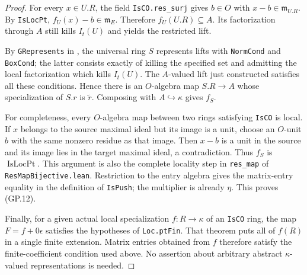 \begin{proof}
For every $x\in U.R$, the field \texttt{IsCO.res\_surj}
gives $b\in O$ with $x-b\in\mathfrak m_{U.R}$.
By \texttt{IsLocPt}, $f_U(x)-b\in\mathfrak m_E$.
Therefore $f_U(U.R)\subseteq A$.  Its factorization through
$A$ still kills $I_t(U)$ and yields the restricted lift.

By \texttt{GRepresents} in
, the universal ring
$S$ represents lifts with \texttt{NormCond} and
\texttt{BoxCond}; the latter consists exactly of killing the
specified set and admitting the local factorization which
kills $I_t(U)$.  The $A$-valued lift just constructed satisfies
all these conditions.  Hence there is an $O$-algebra map
$S.R\to A$ whose specialization of $S.r$ is $\widetilde r$.
Composing with $A\hookrightarrow\kappa$ gives $f_S$.

For completeness, every $O$-algebra map between two rings
satisfying \texttt{IsCO} is local.  If $x$ belongs to the
source maximal ideal but its image is a unit, choose an
$O$-unit $b$ with the same nonzero residue as that image.
Then $x-b$ is a unit in the source and its image lies in the
target maximal ideal, a contradiction.  Thus $f_S$ is
$\operatorname{IsLocPt}$.  This argument is also the complete
locality step in \texttt{res\_map} of
\texttt{ResMapBijective.lean}.  Restriction to the entry
algebra gives the matrix-entry equality in the definition of
\texttt{IsPush}; the multiplier is already $\eta$.
This proves (GP.12).

Finally, for a given actual local specialization $f:R\to\kappa$
of an \texttt{IsCO} ring, the map $F=f+0\epsilon$ satisfies the
hypotheses of \texttt{Loc.ptFin}.  That theorem puts all of
$f(R)$ in a single finite extension.  Matrix entries obtained
from $f$ therefore satisfy the finite-coefficient condition
used above.  No assertion about arbitrary abstract
$\kappa$-valued representations is needed.
\end{proof}


